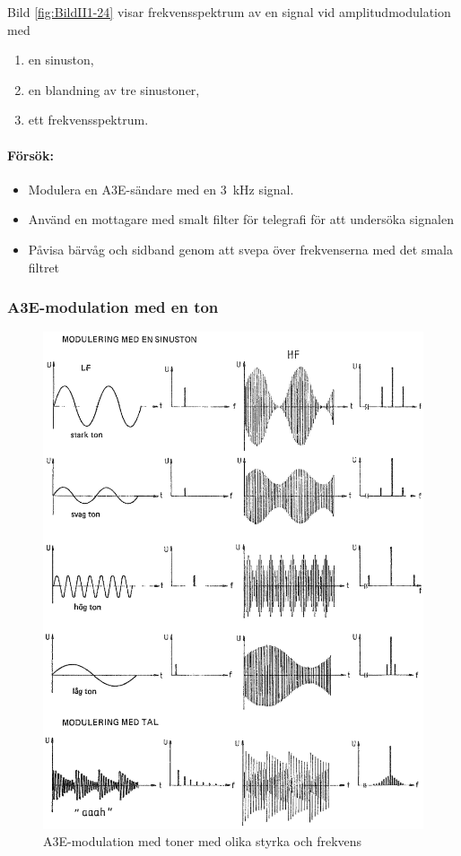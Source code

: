 Bild \ref{fig:BildII1-24} visar frekvensspektrum av en signal vid
amplitudmodulation med

\begin{enumerate}[label=\alph*.,noitemsep]
\item en sinuston,
\item en blandning av tre sinustoner,
\item ett frekvensspektrum.
\end{enumerate}

\paragraph{Försök:}

\begin{itemize}
	\item Modulera en A3E-sändare med en 3~kHz signal.
	\item Använd en mottagare med smalt filter för telegrafi för att undersöka signalen
	\item Påvisa bärvåg och sidband genom att svepa över frekvenserna med det smala filtret
\end{itemize}

\subsubsection{A3E-modulation med en ton}

\begin{figure}
\includegraphics[width=\textwidth]{images/cropped_pdfs/bild_2_1-25.pdf}
\caption{A3E-modulation med toner med olika styrka och frekvens}
\label{fig:BildII1-25}
\end{figure}

